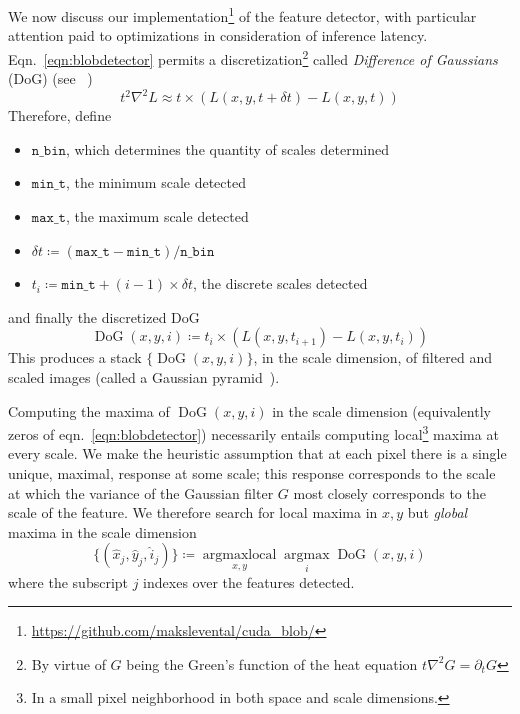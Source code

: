 \documentclass[sigconf,nonacm]{acmart}
\begin{document}
We now discuss our implementation\footnote{\href{https://github.com/makslevental/cuda_blob/}{https://github.com/makslevental/cuda\_blob/}} of the feature detector, with particular attention paid to optimizations in consideration of inference latency.
Eqn.~\ref{eqn:blobdetector} permits a discretization\footnote{By virtue of $G$ being the Green's function of the heat equation $t \nabla^2 G = \partial_t G$} called \textit{Difference of Gaussians} (DoG) (see ~\cite{})
$$
t^2 \nabla^2 L \approx  t \times \left(L(x,y, t + \delta t) - L(x,y, t)\right)
$$
Therefore, define 
\begin{itemize}
    \item $\mathtt{n\_bin}$, which determines the quantity of scales determined
    \item $\mathtt{min\_t}$, the minimum scale detected
    \item $\mathtt{max\_t}$, the maximum scale detected
    \item $\delta t \coloneqq (\mathtt{max\_t} -\mathtt{min\_t})/\mathtt{n\_bin}$
    \item $t_i \coloneqq \mathtt{min\_t} + (i-1) \times \delta t$, the discrete scales detected
\end{itemize}
and finally the discretized DoG
\begin{equation}
\operatorname{DoG}(x,y,i) \coloneqq t_i \times \left( L(x,y,t_{i+1})-L(x,y,t_i) \right)
\label{eqn:dog}
\end{equation}
This produces a stack $\{ \operatorname{DoG}(x,y,i) \}$, in the scale dimension, of filtered and scaled images (called a Gaussian pyramid~\cite{}).

Computing the maxima of $\operatorname{DoG}(x,y,i)$ in the scale dimension (equivalently zeros of eqn.~\ref{eqn:blobdetector}) necessarily entails computing local\footnote{In a small pixel neighborhood in both space and scale dimensions.} maxima at every scale.
We make the heuristic assumption that at each pixel there is a single unique, maximal, response at some scale; this response corresponds to the scale at which the variance of the Gaussian filter $G$ most closely corresponds to the scale of the feature.
We therefore search for local maxima in $x,y$ but \textit{global} maxima in the scale dimension
\begin{equation}
    \{(\hat{x}_j, \hat{y}_j, \hat{i}_j)\} \coloneqq \operatorname*{argmaxlocal}_{x,y} \operatorname*{argmax}_{i} \operatorname{DoG}(x,y,i)
    \label{eqn:argmax}
\end{equation}
where the subscript $j$ indexes over the features detected.
\end{document}
